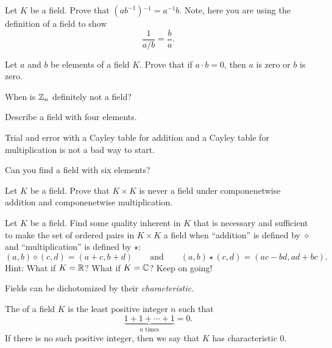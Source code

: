 \documentclass{ximera}
\begin{document}
\begin{exercise}
  Let $K$ be a field. Prove that ${\left(ab^{-1}\right)}\hspace{0pt}^{-1} = a^{-1}
  b$. Note, here you are using the definition of a field to show
  \[
  \frac{1}{a/b} = \frac{b}{a}.
  \]
\end{exercise}


\begin{exercise} 
  Let $a$ and $b$ be elements of a field $K$. Prove that if $a\cdot b
  = 0$, then $a$ is zero or $b$ is zero. 
\end{exercise}




\begin{exercise} 
  When is $\mathbb Z_n$ definitely not a field?
\end{exercise}

\begin{exercise}\label{E:FF4}
  Describe a field with four elements.
  \begin{hint}
    Trial and error with a Cayley table for addition and a Cayley
    table for multiplication is not a bad way to start.
  \end{hint}
\end{exercise}


\begin{exercise}\label{E:FF6} Can you find a field with six elements?
\end{exercise}


\begin{exercise}
  Let $K$ be a field. Prove that $K\times K$ is never a field under
  componenetwise addition and componenetwise multiplication.
\end{exercise}


\begin{exercise} 
Let $K$ be a field. Find some quality inherent in $K$ that is
necessary and sufficient to make the set of ordered pairs in $K\times
K$ a field when ``addition'' is defined by $\diamond$ and
``multiplication'' is defined by $\star$:
\[
(a,b)\diamond (c,d) = (a+c, b+d)\qquad\text{and}\qquad (a,b)\star (c,d) =
(ac-bd,ad+bc).
\]
Hint: What if $K = \mathbb R$? What if $K = \mathbb C$? Keep on going!
\end{exercise}






Fields can be dichotomized by their \textit{characteristic}.

\begin{definition}
The  of a field $K$ is the least positive
integer $n$ such that
\[
\underbrace{1 + 1 + \cdots +1}_{\text{$n$ times}} =0.
\]
If there is no such positive integer, then we say that $K$ has
characteristic $0$.
\end{definition}
\end{document}
